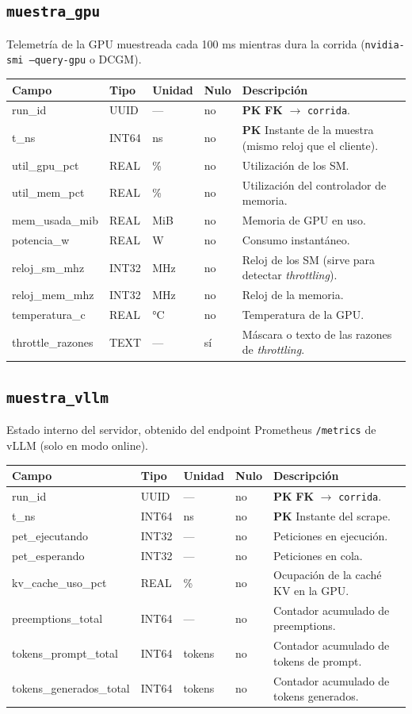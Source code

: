 \documentclass[11pt,a4paper]{article}
\makeatletter
\newcommand{\PK}{\textcolor{pkc}{\textbf{PK}}}
\newcommand{\FK}{\textcolor{fkc}{\textbf{FK}}}
\newenvironment{diccionario}{%
  \small
  \begin{longtable}{@{}>{\raggedright\ttfamily}p{3.4cm}>{\raggedright}p{2.2cm}>{\raggedright}p{1.6cm}p{0.9cm}>{\raggedright\arraybackslash}p{5.8cm}@{}}
  \toprule
  \normalfont\textbf{Campo} & \textbf{Tipo} & \textbf{Unidad} & \textbf{Nulo} & \textbf{Descripción}\\
  \midrule\endhead
  \bottomrule\endfoot
}{\end{longtable}}
\makeatother
\begin{document}
\subsection{\texttt{muestra_gpu}}
Telemetría de la GPU muestreada cada 100 ms mientras dura la corrida (\texttt{nvidia-smi --query-gpu} o DCGM).
\begin{diccionario}
run_id & UUID & — & no & \PK{} \FK{} $\rightarrow$ \texttt{corrida}.\\
t_ns & INT64 & ns & no & \PK{} Instante de la muestra (mismo reloj que el cliente).\\
util_gpu_pct & REAL & \% & no & Utilización de los SM.\\
util_mem_pct & REAL & \% & no & Utilización del controlador de memoria.\\
mem_usada_mib & REAL & MiB & no & Memoria de GPU en uso.\\
potencia_w & REAL & W & no & Consumo instantáneo.\\
reloj_sm_mhz & INT32 & MHz & no & Reloj de los SM (sirve para detectar \emph{throttling}).\\
reloj_mem_mhz & INT32 & MHz & no & Reloj de la memoria.\\
temperatura_c & REAL & °C & no & Temperatura de la GPU.\\
throttle_razones & TEXT & — & sí & Máscara o texto de las razones de \emph{throttling}.\\
\end{diccionario}

\subsection{\texttt{muestra_vllm}}
Estado interno del servidor, obtenido del endpoint Prometheus \texttt{/metrics} de vLLM (solo en modo online).
\begin{diccionario}
run_id & UUID & — & no & \PK{} \FK{} $\rightarrow$ \texttt{corrida}.\\
t_ns & INT64 & ns & no & \PK{} Instante del scrape.\\
pet_ejecutando & INT32 & — & no & Peticiones en ejecución.\\
pet_esperando & INT32 & — & no & Peticiones en cola.\\
kv_cache_uso_pct & REAL & \% & no & Ocupación de la caché KV en la GPU.\\
preemptions_total & INT64 & — & no & Contador acumulado de preemptions.\\
tokens_prompt_total & INT64 & tokens & no & Contador acumulado de tokens de prompt.\\
tokens_generados_total & INT64 & tokens & no & Contador acumulado de tokens generados.\\
\end{diccionario}
\end{document}
